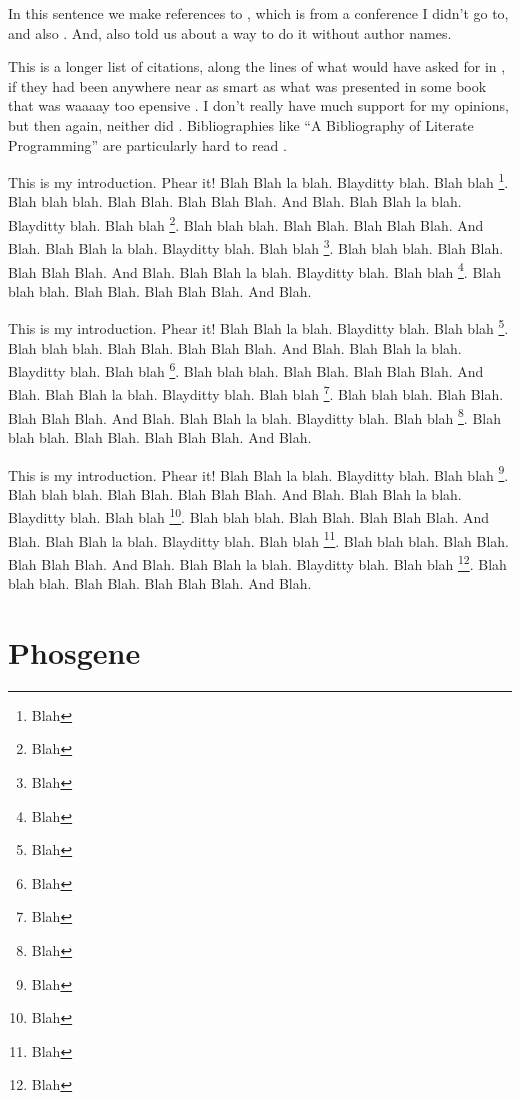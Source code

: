 \documentclass[letterpaper,10pt]{article}
\begin{document}
In this sentence we make references to \cite{SU93.1}, which is from a
conference I didn't go to, and also \cite{DY20.1}.  And,
 also told us about a way to do it without author names.

This is a longer list of citations, along the lines of what
 would have asked for in \cite{e1-207a-e99}, if
they had been anywhere near as smart as what was presented in some
book that was waaaay too epensive \cite{Kristensen83}.  I don't really
have much support \cite{Chen95} for my opinions, but then again,
neither did .  Bibliographies like ``A Bibliography
of Literate Programming'' \cite{Beebe00} are particularly hard to read
\cite{Normark00a}.

This is my introduction.  Phear it!  Blah Blah la blah. Blayditty
blah. Blah blah \footnote{Blah}.  Blah blah blah. Blah Blah.  Blah
Blah Blah.  And Blah. Blah Blah la blah. Blayditty
blah. Blah blah \footnote{Blah}.  Blah blah blah. Blah Blah.  Blah
Blah Blah.  And Blah. Blah Blah la blah. Blayditty
blah. Blah blah \footnote{Blah}.  Blah blah blah. Blah Blah.  Blah
Blah Blah.  And Blah. Blah Blah la blah. Blayditty
blah. Blah blah \footnote{Blah}.  Blah blah blah. Blah Blah.  Blah
Blah Blah.  And Blah.

This is my introduction.  Phear it!  Blah Blah la blah. Blayditty
blah. Blah blah \footnote{Blah}.  Blah blah blah. Blah Blah.  Blah
Blah Blah.  And Blah. Blah Blah la blah. Blayditty
blah. Blah blah \footnote{Blah}.  Blah blah blah. Blah Blah.  Blah
Blah Blah.  And Blah. Blah Blah la blah. Blayditty
blah. Blah blah \footnote{Blah}.  Blah blah blah. Blah Blah.  Blah
Blah Blah.  And Blah. Blah Blah la blah. Blayditty
blah. Blah blah \footnote{Blah}.  Blah blah blah. Blah Blah.  Blah
Blah Blah.  And Blah.

This is my introduction.  Phear it!  Blah Blah la blah. Blayditty
blah. Blah blah \footnote{Blah}.  Blah blah blah. Blah Blah.  Blah
Blah Blah.  And Blah. Blah Blah la blah. Blayditty
blah. Blah blah \footnote{Blah}.  Blah blah blah. Blah Blah.  Blah
Blah Blah.  And Blah. Blah Blah la blah. Blayditty
blah. Blah blah \footnote{Blah}.  Blah blah blah. Blah Blah.  Blah
Blah Blah.  And Blah. Blah Blah la blah. Blayditty
blah. Blah blah \footnote{Blah}.  Blah blah blah. Blah Blah.  Blah
Blah Blah.  And Blah.

\section{Phosgene}
\end{document}

